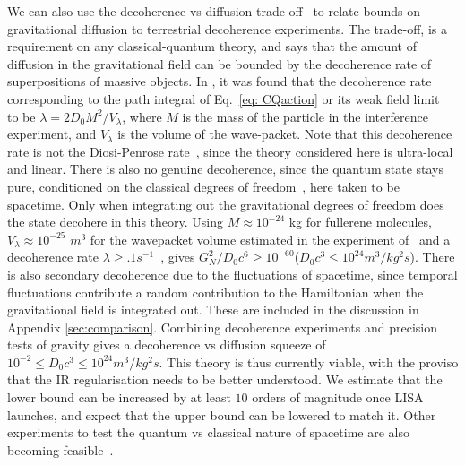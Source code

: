 \documentclass[aps,pra,amsmath,amssymb,amsthm,floatfix,nofootinbib,notitlepage,superscriptaddress,10pt]{revtex4-2}
\begin{document}
We can also use the decoherence vs diffusion trade-off~\cite{oppenheim2023gravitationally} to relate bounds on gravitational diffusion to terrestrial decoherence experiments. The trade-off, is a requirement on any classical-quantum theory, and says that the amount of diffusion in the gravitational field can be bounded by the decoherence rate of superpositions of massive objects.
In \cite{oppenheim2023gravitationally}, it was found that the decoherence rate corresponding to the path integral of Eq.~\eqref{eq: CQaction} or its weak field limit~\cite{layton2023weak} to be $\lambda=2D_{0}M^2/V_\lambda$, where $M$ is the mass of the particle in the interference experiment, and $V_\lambda$ is the volume of the wave-packet. Note that this decoherence rate is not the Diosi-Penrose rate~\cite{karolyhazy1966gravitation,diosi1989models,penrose1996gravity}, since the theory considered here is ultra-local and linear. There is also no genuine decoherence, since the quantum state stays pure, conditioned on the classical degrees of freedom~\cite{layton2023weak}, here taken to be spacetime. Only when integrating out the gravitational degrees of freedom does the state decohere in this theory.  
Using $M\approx 10^{-24}$ kg for fullerene molecules, $V_\lambda\approx 10^{-25}$ $m^3$ for the wavepacket volume estimated in the experiment of~\cite{Gerlich2011} and a decoherence rate $\lambda\geq .1 \unit{s^{-1}}$~\cite{Gerlich2011},
gives $G_N^2/D_0c^6 \geq 10^{-60}$($D_0c^3\leq 10^{24} \unit{m^3/kg^2 s}$).
There is also secondary decoherence due to the fluctuations of spacetime\cite{tilloy2017principle}, since temporal fluctuations contribute a random contribution to the Hamiltonian when the gravitational field is integrated out. These are included in the discussion in Appendix \ref{sec:comparison}. Combining decoherence experiments and precision tests of gravity gives a decoherence vs diffusion squeeze of
$10^{-2}\leq D_0c^3\leq 10^{24} \unit{m^3/kg^2 s}$. This theory is thus currently viable, with the proviso that the IR regularisation needs to be better understood. We estimate that the lower bound can be increased by at least $10$ orders of magnitude once LISA launches, and expect that the upper bound can be lowered to match it. Other 
experiments to test the quantum vs classical nature of spacetime are also becoming feasible~\cite{bose2017spin,marletto2017gravitationally,oppenheim2023gravitationally, lami2023testing,kryhin2023distinguishable,carney2019tabletop}.  
\end{document}
